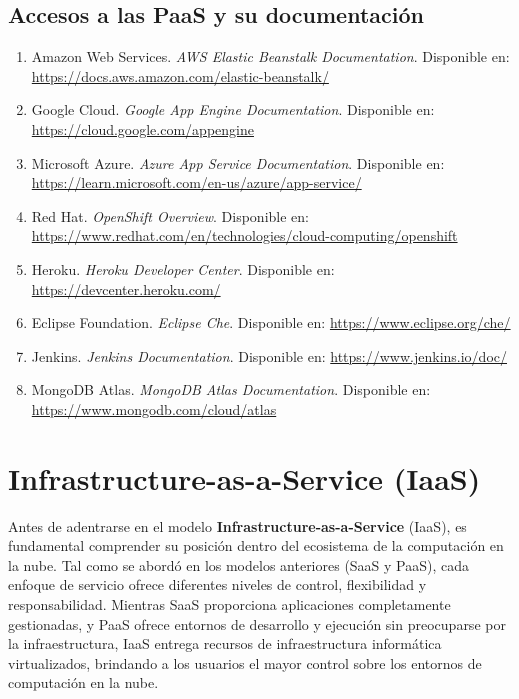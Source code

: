 {        \subsection{Accesos a las PaaS y su documentación}
            \begin{enumerate}
                \item Amazon Web Services. \textit{AWS Elastic Beanstalk Documentation}. Disponible en: \url{https://docs.aws.amazon.com/elastic-beanstalk/}
                \item Google Cloud. \textit{Google App Engine Documentation}. Disponible en: \url{https://cloud.google.com/appengine}
                \item Microsoft Azure. \textit{Azure App Service Documentation}. Disponible en: \url{https://learn.microsoft.com/en-us/azure/app-service/}
                \item Red Hat. \textit{OpenShift Overview}. Disponible en: \url{https://www.redhat.com/en/technologies/cloud-computing/openshift}
                \item Heroku. \textit{Heroku Developer Center}. Disponible en: \url{https://devcenter.heroku.com/}
                \item Eclipse Foundation. \textit{Eclipse Che}. Disponible en: \url{https://www.eclipse.org/che/}
                \item Jenkins. \textit{Jenkins Documentation}. Disponible en: \url{https://www.jenkins.io/doc/}
                \item MongoDB Atlas. \textit{MongoDB Atlas Documentation}. Disponible en: \url{https://www.mongodb.com/cloud/atlas}
            \end{enumerate}
            
    \section{Infrastructure-as-a-Service (IaaS)}

        Antes de adentrarse en el modelo \textbf{Infrastructure-as-a-Service} (IaaS), es fundamental comprender su posición dentro del ecosistema de la computación en la nube. Tal como se abordó en los modelos anteriores (SaaS y PaaS), cada enfoque de servicio ofrece diferentes niveles de control, flexibilidad y responsabilidad. Mientras SaaS proporciona aplicaciones completamente gestionadas, y PaaS ofrece entornos de desarrollo y ejecución sin preocuparse por la infraestructura, IaaS entrega recursos de infraestructura informática virtualizados, brindando a los usuarios el mayor control sobre los entornos de computación en la nube.
        
}
